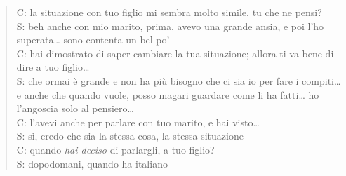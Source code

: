 \begin{verse}
C: la situazione con tuo figlio mi sembra molto simile, tu che ne pensi?\\
S: beh anche con mio marito, prima, avevo una grande ansia, e poi l'ho superata\ldots{} sono contenta un bel po'\\
C: hai dimostrato di saper cambiare la tua situazione; allora ti va bene di dire a tuo figlio\ldots\\
S: che ormai è grande e non ha più bisogno che ci sia io per fare i compiti\ldots e anche che quando vuole, posso magari guardare come li ha fatti\ldots{} ho l'angoscia solo al pensiero\ldots\\
C: l'avevi anche per parlare con tuo marito, e hai visto\ldots\\
S: sì, credo che sia la stessa cosa, la stessa situazione\\
C: quando \emph{hai deciso} di parlargli, a tuo figlio?\\
S: dopodomani, quando ha italiano\\
\end{verse}